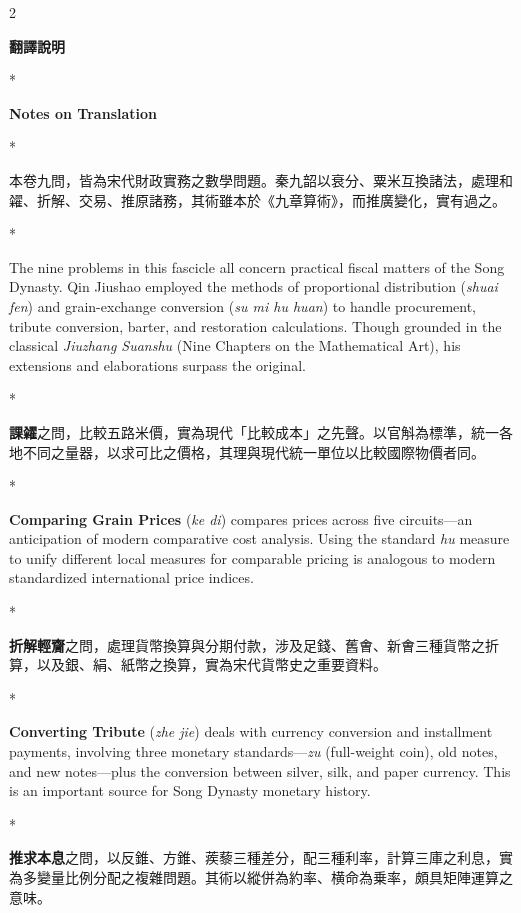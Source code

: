 \documentclass[11pt,a4paper]{article}
\newcommand{\switchCn}{\switchcolumn[0]*}
\newcommand{\switchEn}{\switchcolumn[1]*}
\begin{document}
\begin{paracol}{2}

\textbf{\color{sectioncolor}翻譯說明}

\switchEn

\textbf{\color{sectioncolor}Notes on Translation}

\switchCn

本卷九問，皆為宋代財政實務之數學問題。秦九韶以衰分、粟米互換諸法，處理和糴、折解、交易、推原諸務，其術雖本於《九章算術》，而推廣變化，實有過之。

\switchEn

The nine problems in this fascicle all concern practical fiscal matters of the Song Dynasty. Qin Jiushao employed the methods of proportional distribution (\textit{shuai fen}) and grain-exchange conversion (\textit{su mi hu huan}) to handle procurement, tribute conversion, barter, and restoration calculations. Though grounded in the classical \textit{Jiuzhang Suanshu} (Nine Chapters on the Mathematical Art), his extensions and elaborations surpass the original.

\switchCn

\textbf{課糴}之問，比較五路米價，實為現代「比較成本」之先聲。以官斛為標準，統一各地不同之量器，以求可比之價格，其理與現代統一單位以比較國際物價者同。

\switchEn

\textbf{Comparing Grain Prices} (\textit{ke di}) compares prices across five circuits---an anticipation of modern comparative cost analysis. Using the standard \textit{hu} measure to unify different local measures for comparable pricing is analogous to modern standardized international price indices.

\switchCn

\textbf{折解輕齎}之問，處理貨幣換算與分期付款，涉及足錢、舊㑹、新㑹三種貨幣之折算，以及銀、絹、紙幣之換算，實為宋代貨幣史之重要資料。

\switchEn

\textbf{Converting Tribute} (\textit{zhe jie}) deals with currency conversion and installment payments, involving three monetary standards---\textit{zu} (full-weight coin), old notes, and new notes---plus the conversion between silver, silk, and paper currency. This is an important source for Song Dynasty monetary history.

\switchCn

\textbf{推求本息}之問，以反錐、方錐、蒺藜三種差分，配三種利率，計算三庫之利息，實為多變量比例分配之複雜問題。其術以縱併為約率、横命為乗率，頗具矩陣運算之意味。


\end{paracol}
\end{document}
